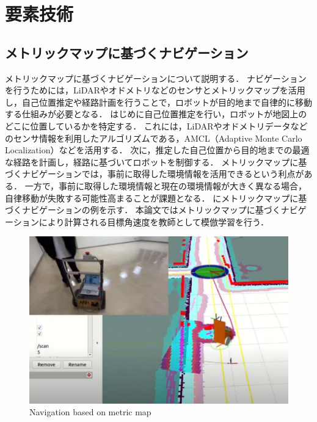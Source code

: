 \chapter{要素技術}
\section{メトリックマップに基づくナビゲーション}
メトリックマップに基づくナビゲーションについて説明する．
ナビゲーションを行うためには，LiDARやオドメトリなどのセンサとメトリックマップを活用し，自己位置推定や経路計画を行うことで，ロボットが目的地まで自律的に移動する仕組みが必要となる．
はじめに自己位置推定を行い，ロボットが地図上のどこに位置しているかを特定する．
これには，LiDARやオドメトリデータなどのセンサ情報を利用したアルゴリズムである，AMCL（Adaptive Monte Carlo Localization）などを活用する．
次に，推定した自己位置から目的地までの最適な経路を計画し，経路に基づいてロボットを制御する．
メトリックマップに基づくナビゲーションでは，事前に取得した環境情報を活用できるという利点がある．
一方で，事前に取得した環境情報と現在の環境情報が大きく異なる場合，自律移動が失敗する可能性高まることが課題となる．
にメトリックマップに基づくナビゲーションの例を示す．
本論文ではメトリックマップに基づくナビゲーションにより計算される目標角速度を教師として模倣学習を行う．

\begin{figure}[htbp]
  \centering
  \includegraphics[width=130mm]{images/pdf/other/nav.pdf}
  \caption{Navigation based on metric map}
  \label{fig:nav}
\end{figure}